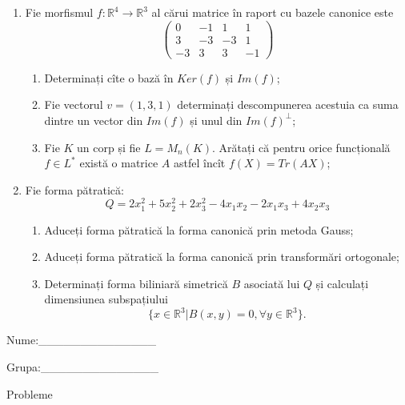 \documentclass{article}
\begin{document}
\begin{enumerate}
 \item Fie morfismul $f:\mathbb{R}^4 \to \mathbb{R}^3$ al cărui matrice în raport cu bazele canonice este
$$\begin{pmatrix}
0&-1&1&1\\
3&-3&-3&1\\
-3&3&3&-1
\end{pmatrix}$$

\begin{enumerate}
\item Determinați cîte o bază în $Ker(f)$ și $Im(f)$;
\item Fie vectorul $v=(1,3,1)$ determinați descompunerea acestuia ca suma dintre un vector din $Im(f)$ și unul din $Im(f)^\perp$;
\item Fie $K$ un corp și fie $L=M_n(K)$. Arătați că pentru orice funcțională $f \in L^*$ există o matrice $A$ astfel încît $f(X)=Tr(AX)$;
\end{enumerate}
\item Fie forma pătratică:
$$Q= 2x_1^2+5x_2^2+2x_3^2-4x_1x_2-2x_1x_3+4x_2x_3$$

\begin{enumerate}
\item Aduceți forma pătratică la forma canonică prin metoda Gauss;
\item Aduceți forma pătratică la forma canonică prin transformări ortogonale;
\item Determinați forma biliniară simetrică $B$ asociată lui $Q$ și calculați dimensiunea subspațiului
$$\{x \in \mathbb{R}^3 | B(x,y)=0,\forall y \in \mathbb{R}^3\}.$$

\end{enumerate}
\end{enumerate}
\newpage
\begin{flushright}
Nume:\_\_\_\_\_\_\_\_\_\_\_\_\_\_
 
 
Grupa:\_\_\_\_\_\_\_\_\_\_\_\_\_\_
\end{flushright}
\begin{center}
\vspace{2cm}
{\Large Probleme}
\vspace{2cm}
\end{center}
\end{document}
